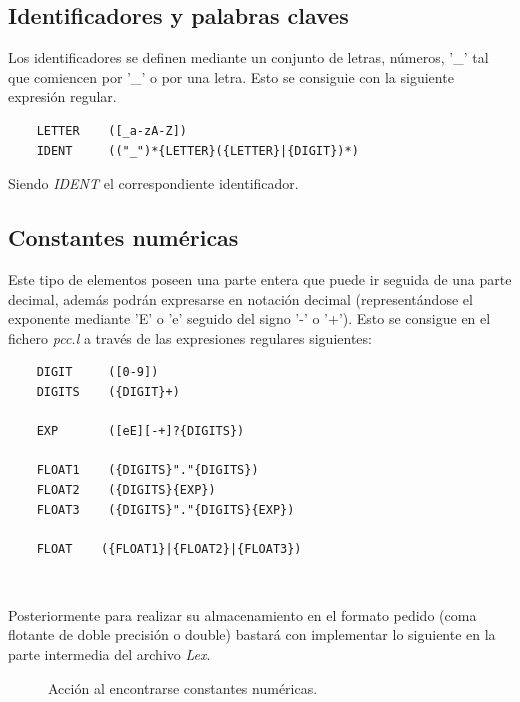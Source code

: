 \documentclass[11pt]{article}
\begin{document}
\subsection{Identificadores y palabras claves}

\noindent Los identificadores se definen mediante un conjunto de letras, números, '\_' tal que comiencen por '\_' o por una letra. Esto se consiguie con la siguiente expresión regular. 

\begin{verbatim}
    LETTER    ([_a-zA-Z])
    IDENT     (("_")*{LETTER}({LETTER}|{DIGIT})*)
\end{verbatim}


\noindent Siendo \textit{IDENT} el correspondiente identificador.

\subsection{Constantes numéricas}

\noindent Este tipo de elementos poseen una parte entera que puede ir seguida de una parte decimal, además podrán expresarse en notación decimal (representándose el exponente mediante 'E' o 'e' seguido del signo '-' o '+'). Esto se consigue en el fichero \textit{pcc.l} a través de las expresiones regulares siguientes: \\

\begin{verbatim}
    DIGIT     ([0-9])
    DIGITS    ({DIGIT}+)
    
    EXP       ([eE][-+]?{DIGITS})
    
    FLOAT1    ({DIGITS}"."{DIGITS})
    FLOAT2    ({DIGITS}{EXP})
    FLOAT3    ({DIGITS}"."{DIGITS}{EXP})
    
    FLOAT    ({FLOAT1}|{FLOAT2}|{FLOAT3})

\end{verbatim}
\\

\newpage

\noindent Posteriormente para realizar su almacenamiento en el formato pedido (coma flotante de doble precisión o double) bastará con implementar lo siguiente en la parte intermedia del archivo \textit{Lex}. \\

\begin{figure}[H]
  \centering
  \caption{Acción al encontrarse constantes numéricas.}
\end{figure}
\end{document}
